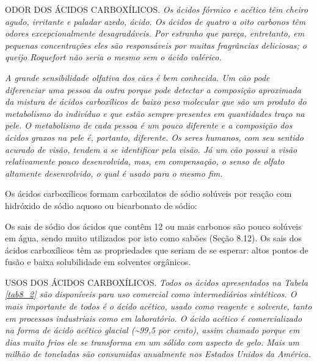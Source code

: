\par\bigskip
\noindent ODOR DOS ÁCIDOS CARBOXÍLICOS. \emph{Os ácidos fórmico e acético têm cheiro agudo, irritante e paladar azedo, ácido. Os ácidos de quatro a oito carbonos têm odores excepcionalmente desagradáveis. Por estranho que pareça, entretanto, em pequenas concentrações eles são responsáveis por muitas fragrâncias deliciosas; o queijo Roquefort não seria o mesmo sem o ácido valérico.}

\emph{A grande sensibilidade olfativa dos cães é bem conhecida. Um cão pode diferenciar uma pessoa da outra porque pode detectar a composição aproximada da mistura de ácidos carboxílicos de baixo peso molecular que são um produto do metabolismo do indivíduo e que estão sempre presentes em quantidades traço na pele. O metabolismo de cada pessoa é um pouco diferente e a composição dos ácidos graxos na pele é, portanto, diferente. Os seres humanos, com seu sentido acurado de visão, tendem a se identificar pela visão. Já um cão possui a visão relativamente pouco desenvolvida, mas, em compensação, o senso de olfato altamente desenvolvido, o qual é usado para o mesmo fim.}
\par\bigskip

Os ácidos carboxílicos formam carboxilatos de sódio solúveis por reação com hidróxido de sódio aquoso ou bicarbonato de sódio:

\begin{tightcenter}
\end{tightcenter}

\noindent Os sais de sódio dos ácidos que contêm 12 ou mais carbonos são pouco solúveis em água, sendo muito utilizados por isto como sabões (Seção 8.12). Os sais dos ácidos carboxílicos têm as propriedades que seriam de se esperar: altos pontos de fusão e baixa solubilidade em solventes orgânicos.

\par\bigskip
\noindent USOS DOS ÁCIDOS CARBOXÍLICOS. \emph{Todos os ácidos apresentados na Tabela \ref{tab8_2} são disponíveis para uso comercial como intermediários sintéticos. O mais importante de todos é o ácido acético, usado como reagente e solvente, tanto em processos industriais como em laboratório. O ácido acético é comercializado na forma de ácido acético glacial (\sim 99,5 por cento), assim chamado porque em dias muito frios ele se transforma em um sólido com aspecto de gelo. Mais um milhão de toneladas são consumidas anualmente nos Estados Unidos da América.}

